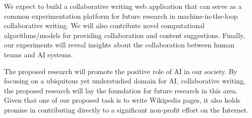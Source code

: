 
 We expect to build a collaborative writing web application that can serve as a common experimentation platform for future research in machine-in-the-loop collaborative writing.
We will also contribute novel computational algorithms/models for providing collaboration and content suggestions.
Finally, our experiments will reveal insights about the collaboration between human teams and AI systems.

 The proposed research will promote the positive role of AI in our society.
By focusing on a ubiquitous yet understudied domain for AI, collaborative writing, the proposed research will lay the foundation for future research in this area.
Given that one of our proposed task is to write Wikipedia pages, it also holds promise in contributing directly to a significant non-profit effort on the Internet.
